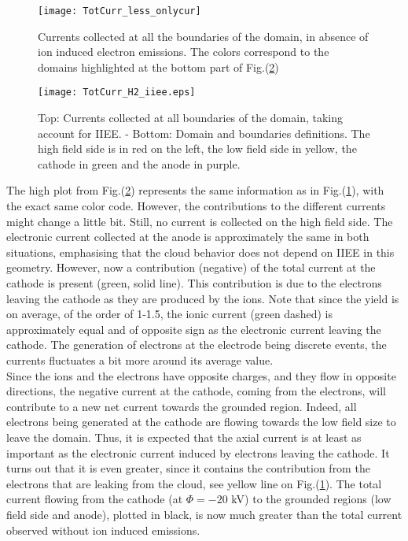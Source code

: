\begin{figure}[h!]
\centering
	\texttt{[image: TotCurr\_less\_onlycur]}
	\caption{\label{TotCurr_less} Currents collected at all the boundaries of the domain, in absence of ion induced electron emissions. The colors correspond to the domains highlighted at the bottom part of  Fig.(\ref{TotCurr_H2})}
\end{figure} 

\begin{figure}[h!]
\centering
	\texttt{[image: TotCurr\_H2\_iiee.eps]}
	\caption{\label{TotCurr_H2} Top: Currents collected at all boundaries of the domain, taking account for IIEE. - Bottom: Domain and boundaries definitions. The high field side is in red on the left, the low field side in yellow, the cathode in green and the anode in purple.}
\end{figure} 

The high plot from Fig.(\ref{TotCurr_H2}) represents the same information as in Fig.(\ref{TotCurr_less}), with the exact same color code. However, the contributions to the different currents might change a little bit. Still, no current is collected on the high field side. The electronic current collected at the anode is approximately the same in both situations, emphasising that the cloud behavior does not depend on IIEE in this geometry. However, now a contribution (negative) of the total current at the cathode is present (green, solid line). This contribution is due to the electrons leaving the cathode as they are produced by the ions. Note that since the yield is on average, of the order of 1-1.5, the ionic current (green dashed) is approximately equal and of opposite sign as the electronic current leaving the cathode. The generation of electrons at the electrode being discrete events, the currents fluctuates a bit more around its average value. \\

\noindent Since the ions and the electrons have opposite charges, and they flow in opposite directions, the negative current at the cathode, coming from the electrons, will contribute to a new net current towards the grounded region. Indeed, all electrons being generated at the cathode are flowing towards the low field size to leave the domain. Thus, it is expected that the axial current is at least as important as the electronic current induced by electrons leaving the cathode. It turns out that it is even greater, since it contains the contribution from the electrons that are leaking from the cloud, see yellow line on Fig.(\ref{TotCurr_less}). The total current flowing from the cathode (at $\Phi = -20$ kV) to the grounded regions (low field side and anode), plotted in black, is now much greater than the total current observed without ion induced emissions. \\

